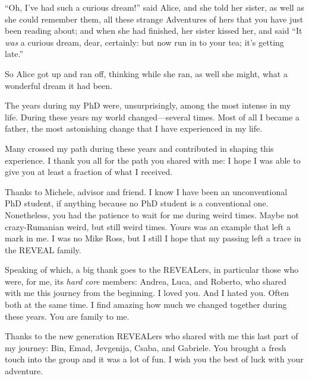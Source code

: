 
\begin{acknowledgements}

\begin{center}
\begin{minipage}{.93\linewidth}
``Oh, I've had such a curious dream!'' said Alice, and she told her
sister, as well as she could remember them, all these strange Adventures
of hers that you have just been reading about; and when she had finished, her sister kissed her, and said ``It \emph{was} a curious dream, dear, certainly: but now run in to your tea; it's getting late.''

So Alice got up and ran off, thinking while she ran, as well she might,
what a wonderful dream it had been.
\end{minipage}
\end{center}

\smallskip


The years during my PhD were, unsurprisingly, among the most intense in my life.
During these years my world changed---several times.
Most of all I became a father, the most astonishing change that I have experienced in my life.

Many crossed my path during these years and contributed in shaping this experience.
I thank you all for the path you shared with me: I hope I was able to give you at least a fraction of what I received.

Thanks to Michele, advisor and friend.
I know I have been an unconventional PhD student, if anything because no PhD student is a conventional one.
Nonetheless, you had the patience to wait for me during weird times.
Maybe not crazy-Rumanian weird, but still weird times.
Yours was an example that left a mark in me.
I was no Mike Ross, but I still I hope that my passing left a trace in the REVEAL family.

Speaking of which, a big thank goes to the REVEALers, in particular those who were, for me, its \emph{hard core} members: Andrea, Luca, and Roberto, who shared with me this journey from the beginning.
I loved you. And I hated you. Often both at the same time.
I find amazing how much we changed together during these years.
You are family to me.

Thanks to the new generation REVEALers who shared with me this last part of my journey: Bin, Emad, Jevgenija, Csaba, and Gabriele.
You brought a fresh touch into the group and it was a lot of fun.
I wish you the best of luck with your adventure.


\end{acknowledgements}

